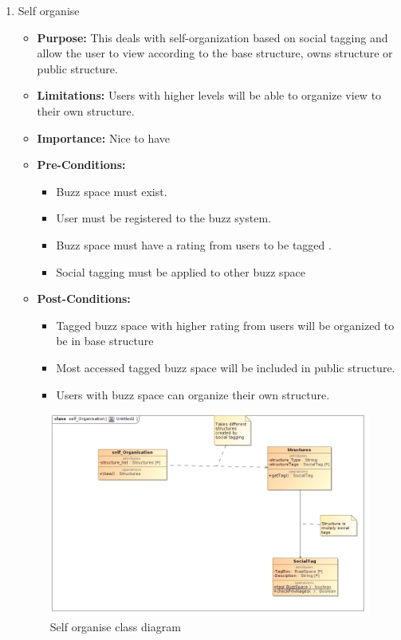 \documentclass[11pt]{article}
\begin{document}
\begin{enumerate}
\item Self organise
\begin{itemize}
\item \textbf{Purpose:}
This deals with self-organization based on social tagging and
allow the user to view according to the base structure, owns structure
or public structure.
\item \textbf{Limitations:} 
Users with higher levels will be able to
organize view to their own structure.

\item \textbf{Importance:}  Nice to have
\item \textbf{Pre-Conditions: }
	\begin{itemize}
	\item Buzz space must exist.
	\item User must be registered to the buzz system.
	\item Buzz space must have a rating from users to be tagged .
	\item Social tagging must be applied to other buzz space
	\end{itemize}

\item\textbf{Post-Conditions: }
	\begin{itemize}
	\item Tagged buzz space with higher rating from users will be organized
to be in base structure
	\item Most accessed tagged buzz space will be included in public structure.
	\item Users with buzz space can organize their own structure.
	\end{itemize}
\end{itemize}

\begin{figure}[H]	
\graphicspath{ {../Diagrams/sfiso/} }
    	\includegraphics[scale=0.5]{selfC.jpg}
    	\caption{Self organise class diagram}
	\end{figure}


\end{enumerate}
\end{document}
